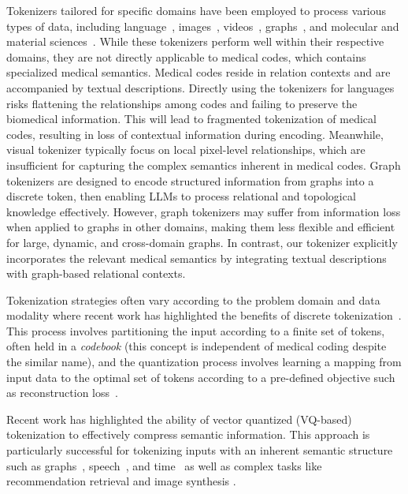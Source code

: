 Tokenizers tailored for specific domains have been employed to process various types of data, including language~\cite{bpe,sentencepiece,wordpiece,Wang2024challenging,Minixhofer2024zeroshot}, images~\cite{ibot,vqgan,Yu2024difftok,Zha2024textok}, videos~\cite{Choudhury2024dontlook}, graphs~\cite{Perozzi2024graphtalk,vqgraph}, and molecular and material sciences~\cite{Fu2024moltok,Tahmid2024birna,Qiao2024mxdna}. While these tokenizers perform well within their respective domains, they are not directly applicable to medical codes, which contains specialized medical semantics. Medical codes reside in relation contexts and are accompanied by textual descriptions. Directly using the tokenizers for languages risks flattening the relationships among codes and failing to preserve the biomedical information. This will lead to fragmented tokenization of medical codes, resulting in loss of contextual information during encoding.
Meanwhile, visual tokenizer typically focus on local pixel-level relationships, which are insufficient for capturing the complex semantics inherent in medical codes. Graph tokenizers are designed to encode structured information from graphs into a discrete token, then enabling LLMs to process relational and topological knowledge effectively. However, graph tokenizers may suffer from information loss when applied to graphs in other domains, making them less flexible and efficient for large, dynamic, and cross-domain graphs. In contrast, our \model tokenizer explicitly incorporates the relevant medical semantics by integrating textual descriptions with graph-based relational contexts.


Tokenization strategies often vary according to the problem domain and data modality where recent work has highlighted the benefits of discrete tokenization~\cite{du2024role}. This process involves partitioning the input according to a finite set of tokens, often held in a \textit{codebook} (this concept is independent of medical coding despite the similar name), and the quantization process involves learning a mapping from input data to the optimal set of tokens according to a pre-defined objective such as reconstruction loss~\cite{van2017neural}. 

Recent work has highlighted the ability of vector quantized (VQ-based) tokenization to effectively compress semantic information\cite{gu2024rethinking}. This approach is particularly successful for tokenizing inputs with an inherent semantic structure such as graphs~\cite{yang2023vqgraph, wang2024learning}, speech~\cite{zeghidour2021soundstream, baevski2019vq}, and time~\cite{yu2021vector} as well as complex tasks like recommendation retrieval \cite{wang2024learnable, rajput2023recommender, sun2024learning} and image synthesis \cite{zhang2023regularized, yu2021vector}.

